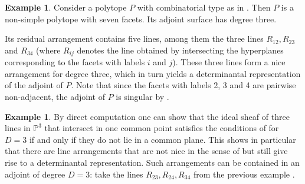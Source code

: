 \documentclass[a4paper,10pt]{amsart}
\theoremstyle{definition}
\newtheorem{ex}[Def]{Example}
\theoremstyle{plain}
\newcommand{\pp}{\mathbb{P}}
\begin{document}
\begin{ex}\label{ex:exmplnonsimple}
Consider a polytope $P$ with combinatorial type as in . Then $P$ is a non-simple polytope with seven facets. Its adjoint surface has degree three.
\begin{figure}[h]
    \centering
{}
    \label{fig:exmplnonsimple}
\end{figure}
Its residual arrangement contains five lines, among them the three lines $R_{12}, R_{23}$ and $R_{34}$ (where $R_{ij}$ denotes the line obtained by intersecting the hyperplanes corresponding to the facets with labels $i$ and $j$). These three lines form a nice arrangement for degree three, which in turn yields a determinantal representation of the adjoint of $P$. Note that since the facets with labels 2, 3 and 4 are pairwise non-adjacent, the adjoint of $P$ is singular by .
\end{ex}

\begin{ex}\label{ex:non-nicearrangement}
    By direct computation one can show that the ideal sheaf of three lines in $\pp^3$ that intersect in one common point satisfies the conditions of  for $D=3$ if and only if they do not lie in a common plane. This shows in particular that there are line arrangements that are not nice in the sense of  but still give rise to a determinantal representation. Such arrangements can be contained in an adjoint of degree $D=3$: take the lines $R_{23},R_{24},R_{34}$ from the previous example .
\end{ex}
\end{document}

